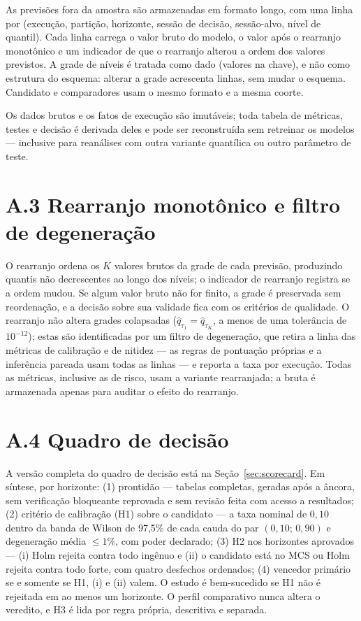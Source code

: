 As previsões fora da amostra são armazenadas em formato longo, com uma linha por (execução, partição, horizonte, sessão de decisão, sessão-alvo, nível de quantil). Cada linha carrega o valor bruto do modelo, o valor após o rearranjo monotônico e um indicador de que o rearranjo alterou a ordem dos valores previstos. A grade de níveis é tratada como dado (valores na chave), e não como estrutura do esquema: alterar a grade acrescenta linhas, sem mudar o esquema. Candidato e comparadores usam o mesmo formato e a mesma coorte.

Os dados brutos e os fatos de execução são imutáveis; toda tabela de métricas, testes e decisão é derivada deles e pode ser reconstruída sem retreinar os modelos --- inclusive para reanálises com outra variante quantílica ou outro parâmetro de teste.

\section*{A.3 Rearranjo monotônico e filtro de degeneração}

O rearranjo ordena os \(K\) valores brutos da grade de cada previsão, produzindo quantis não decrescentes ao longo dos níveis; o indicador de rearranjo registra se a ordem mudou. Se algum valor bruto não for finito, a grade é preservada sem reordenação, e a decisão sobre sua validade fica com os critérios de qualidade. O rearranjo não altera grades colapsadas (\(\hat{q}_{\tau_1} = \hat{q}_{\tau_K}\), a menos de uma tolerância de \(10^{-12}\)); estas são identificadas por um filtro de degeneração, que retira a linha das métricas de calibração e de nitidez --- as regras de pontuação próprias e a inferência pareada usam todas as linhas --- e reporta a taxa por execução. Todas as métricas, inclusive as de risco, usam a variante rearranjada; a bruta é armazenada apenas para auditar o efeito do rearranjo.

\section*{A.4 Quadro de decisão}

A versão completa do quadro de decisão está na Seção~\ref{sec:scorecard}. Em síntese, por horizonte: (1) prontidão --- tabelas completas, geradas após a âncora, sem verificação bloqueante reprovada e sem revisão feita com acesso a resultados; (2) critério de calibração (H1) sobre o candidato --- a taxa nominal de \(0{,}10\) dentro da banda de Wilson de 97,5\% de cada cauda do par \((0{,}10;\,0{,}90)\) e degeneração média \(\leq 1\%\), com poder declarado; (3) H2 nos horizontes aprovados --- (i) Holm rejeita contra todo ingênuo e (ii) o candidato está no MCS ou Holm rejeita contra todo forte, com quatro desfechos ordenados; (4) vencedor primário se e somente se H1, (i) e (ii) valem. O estudo é bem-sucedido se H1 não é rejeitada em ao menos um horizonte. O perfil comparativo nunca altera o veredito, e H3 é lida por regra própria, descritiva e separada.

